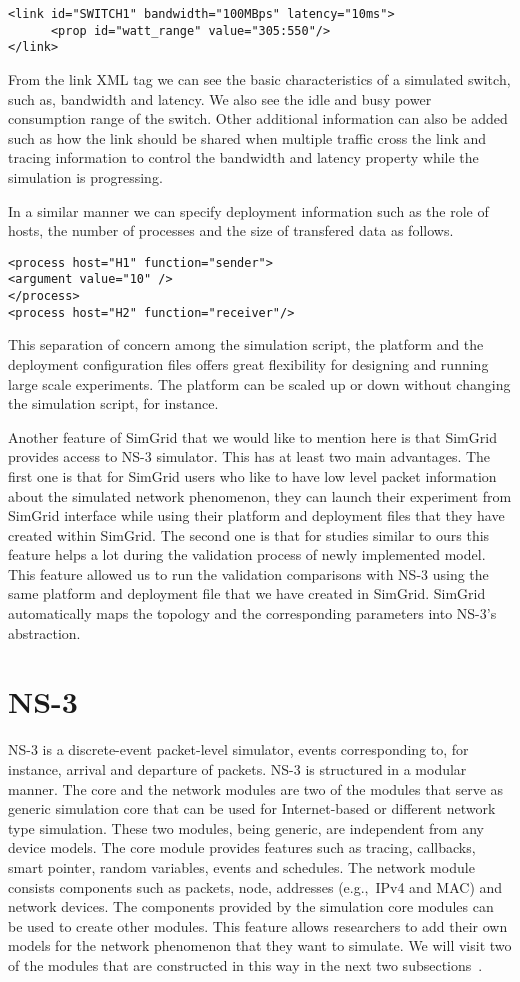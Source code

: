 \begin{lstlisting}
<link id="SWITCH1" bandwidth="100MBps" latency="10ms">
      <prop id="watt_range" value="305:550"/>
</link>
\end{lstlisting}

From the link XML tag we can see the basic characteristics of a simulated switch, such as, bandwidth and latency. We also see the idle and busy power consumption range of the switch. Other additional information can also be added such as how the link should be shared when multiple traffic cross the link and tracing information to control the bandwidth and latency property while the simulation is progressing. 

In a similar manner we can specify deployment information such as the role of hosts, the number of processes and the size of transfered data as follows. 
\begin{lstlisting}
<process host="H1" function="sender">
<argument value="10" />
</process>
<process host="H2" function="receiver"/>
\end{lstlisting}
This separation of concern among the simulation script, the platform and the deployment configuration files offers great flexibility for designing and running large scale experiments. The platform can be scaled up or down without changing the simulation script, for instance. 

Another feature of SimGrid that we would like to mention here is that SimGrid provides access to NS-3 simulator. This has at least two main advantages. The first one is that for SimGrid users who like to have low level packet information about the simulated network phenomenon, they can launch their experiment from SimGrid interface while using their platform and deployment files that they have created within SimGrid. The second one is that for studies similar to ours this feature helps a lot during the validation process of newly implemented model. This feature allowed us to run the validation comparisons with NS-3 using the same platform and deployment file that we have created in SimGrid. SimGrid automatically maps the topology and the corresponding parameters into NS-3's abstraction.
\section{NS-3}
NS-3 is a discrete-event packet-level simulator, events corresponding to, for instance, arrival and departure of packets. NS-3 is structured in a modular manner. The core and the network modules are two of the modules that serve as generic simulation core that can be used for Internet-based or different network type simulation. These two modules, being generic, are independent from any device models. The core module provides features such as tracing, callbacks, smart pointer, random variables, events and schedules. The network module consists components such as packets, node, addresses (e.g.,~IPv4 and MAC) and network devices. The components provided by the simulation core modules can be used to create other modules. This feature allows researchers to add their own models for the network phenomenon that they want to simulate. We will visit two of the modules that are constructed in this way in the next two subsections~\cite{ns3}. 

